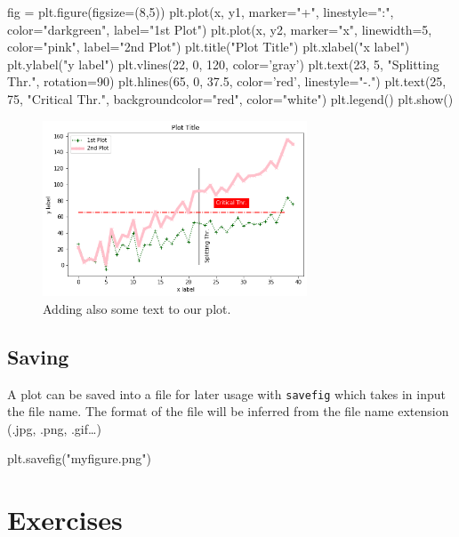 \begin{ipython}
fig = plt.figure(figsize=(8,5))
plt.plot(x, y1, marker="+", linestyle=":", color="darkgreen", label="1st Plot")
plt.plot(x, y2, marker="x", linewidth=5, color="pink", label="2nd Plot")
plt.title("Plot Title")
plt.xlabel("x label")
plt.ylabel("y label")
plt.vlines(22, 0, 120, color='gray')
plt.text(23, 5, "Splitting Thr.", rotation=90)
plt.hlines(65, 0, 37.5, color='red', linestyle="-.")
plt.text(25, 75, "Critical Thr.", backgroundcolor="red", color="white")
plt.legend()
plt.show()
\end{ipython}

\begin{figure}[htb]
	\centering
	\includegraphics[width=0.7\textwidth]{figures/text}
	\caption{Adding also some text to our plot.}
	\label{fig:text}
\end{figure}

\subsection{Saving}\label{saving}

A plot can be saved into a file for later usage with \texttt{savefig} which takes in input the file name. The format of the file will be inferred from the file name extension (.jpg, .png, .gif\ldots)

\begin{ipython}
plt.savefig("myfigure.png")
\end{ipython}

\section*{Exercises}

